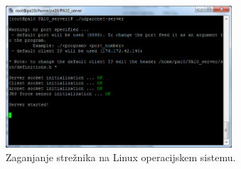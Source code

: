 \begin{figure}[!th]
	\centering
	\includegraphics[width=0.75\textwidth]{./Slike/linux-success.png}
	\caption{Zaganjanje stre\v{z}nika na Linux operacijskem sistemu.}
	\label{fig:linux-success}
\end{figure}
